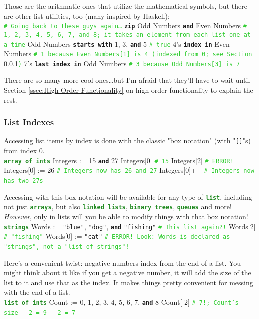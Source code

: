 \documentclass{article}
\newcommand{\sssecl}[1]{\subsubsection{#1}\label{sssec:#1}}
\newcommand{\codecomment}[1]{\texttt{\textcolor{LimeGreen}{#1}}}
\newcommand{\commentline}[1]{\codecomment{\# #1}}
\newcommand{\type}[1]{\texttt{\textcolor{ForestGreen}{\textbf{#1}}}}
\newcommand{\common}[1]{\texttt{\textcolor{Mulberry}{\textbf{#1}}}}
\newcommand{\codestring}[1]{\texttt{\textcolor{NavyBlue}{"#1"}}}
\newenvironment{code}[0]
{\ttfamily{}				%
\setlength\parindent{0cm}	%
~\\}
{\setlength\parindent{1cm}
~\\}
\begin{document}
\indent Those are the arithmatic ones that utilize the mathematical symbols, but there are other list utilities, too (many inspired by Haskell):
\begin{code}
\commentline{Going back to these guys again\ldots}
\common{zip} Odd Numbers \common{and} Even Numbers \commentline{1, 2, 3, 4, 5, 6, 7, and 8; it takes an element from each list one at a time}
Odd Numbers \common{starts with} 1, 3, \common{and} 5 \commentline{true}
4's \common{index in} Even Numbers \commentline{1 because Even Numbers[1] is 4 (indexed from 0; see Section \ref{sssec:List Indexes})}
7's \common{last index in} Odd Numbers \commentline{3 because Odd Numbers[3] is 7}
\end{code}

\indent There are so many more cool ones\ldots but I'm afraid that they'll have to wait until Section \ref{ssec:High Order Functionality} on high-order functionality to explain the rest.

\sssecl{List Indexes}
\indent Accessing list items by index is done with the classic "box notation" (with "\texttt{[]}"s) from index 0.
\begin{code}
\type{array of ints} Integers := 15 \common{and} 27
Integers[0]	\commentline{15}
Integers[2] \commentline{ERROR!}
Integers[0] := 26	\commentline{Integers now has 26 and 27}
Integers[0]++	\commentline{Integers now has two 27s}
\end{code}

\indent Accessing with this box notation will be available for any type of \type{list}, including not just \type{arrays}, but also \type{linked lists}, \type{binary trees}, \type{queues} and more! \emph{However}, only in lists will you be able to modify things with that box notation!
\begin{code}
\type{strings} Words := \codestring{blue}, \codestring{dog}, \common{and} \codestring{fishing} \commentline{This list again?!}
Words[2] \commentline{"fishing"}
Words[0] := \codestring{cat} \commentline{ERROR! Look: Words is declared as "strings", not a "list of strings"!}
\end{code}

\indent Here's a convenient twist: negative numbers index from the end of a list. You might think about it like if you get a negative number, it will add the size of the list to it and use that as the index. It makes things pretty convenient for messing with the end of a list.
\begin{code}
\type{list of ints} Count := 0, 1, 2, 3, 4, 5, 6, 7, \common{and} 8
Count[-2] \commentline{7!; Count's size - 2 = 9 - 2 = 7}
\end{code}
\end{document}
